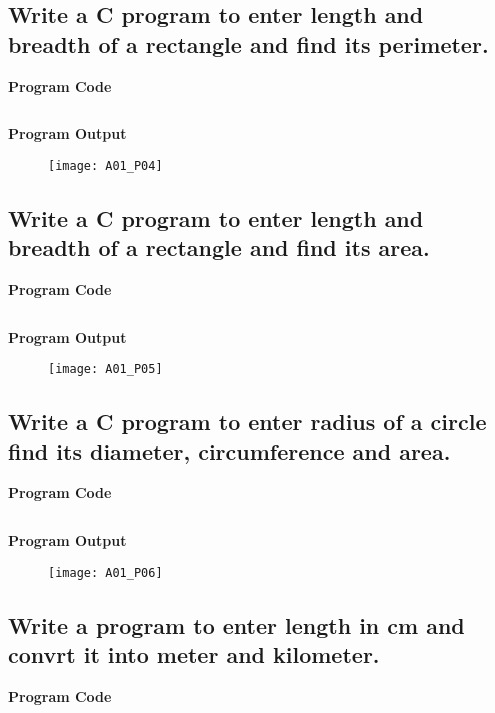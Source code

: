 \subsection{Write a C program to enter length and breadth of a rectangle and find its perimeter.}
\textbf{Program Code}

\inputminted{C}{programs/A01_P04.c}

\textbf{Program Output}

\begin{figure}[h]
  \texttt{[image: A01\_P04]}
\end{figure}

\newpage



\subsection{Write a C program to enter length and breadth of a rectangle and find its area.}
\textbf{Program Code}

\inputminted{C}{programs/A01_P05.c}

\textbf{Program Output}

\begin{figure}[h]
  \texttt{[image: A01\_P05]}
\end{figure}

\newpage



\subsection{Write a C program to enter radius of a circle find its diameter, circumference and area.}
\textbf{Program Code}

\inputminted{C}{programs/A01_P06.c}

\textbf{Program Output}

\begin{figure}[h]
  \texttt{[image: A01\_P06]}
\end{figure}

\newpage



\subsection{Write a program to enter length in cm and convrt it into meter and kilometer.}
\textbf{Program Code}

